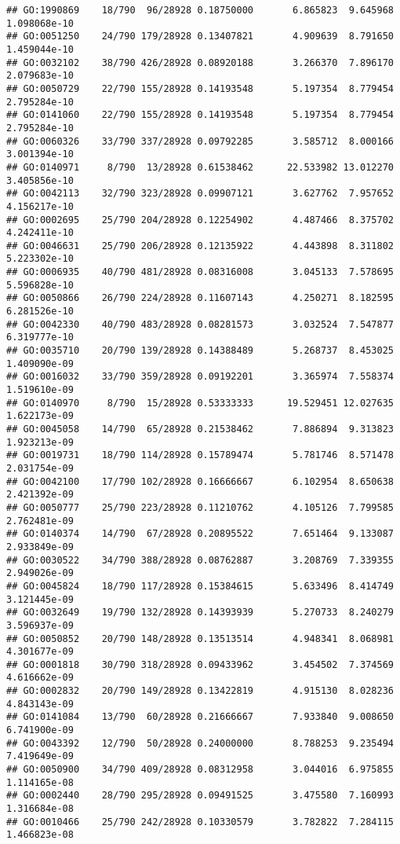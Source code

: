 \documentclass[
]{article}
\begin{document}
\begin{verbatim}
## GO:1990869    18/790  96/28928 0.18750000       6.865823  9.645968 1.098068e-10
## GO:0051250    24/790 179/28928 0.13407821       4.909639  8.791650 1.459044e-10
## GO:0032102    38/790 426/28928 0.08920188       3.266370  7.896170 2.079683e-10
## GO:0050729    22/790 155/28928 0.14193548       5.197354  8.779454 2.795284e-10
## GO:0141060    22/790 155/28928 0.14193548       5.197354  8.779454 2.795284e-10
## GO:0060326    33/790 337/28928 0.09792285       3.585712  8.000166 3.001394e-10
## GO:0140971     8/790  13/28928 0.61538462      22.533982 13.012270 3.405856e-10
## GO:0042113    32/790 323/28928 0.09907121       3.627762  7.957652 4.156217e-10
## GO:0002695    25/790 204/28928 0.12254902       4.487466  8.375702 4.242411e-10
## GO:0046631    25/790 206/28928 0.12135922       4.443898  8.311802 5.223302e-10
## GO:0006935    40/790 481/28928 0.08316008       3.045133  7.578695 5.596828e-10
## GO:0050866    26/790 224/28928 0.11607143       4.250271  8.182595 6.281526e-10
## GO:0042330    40/790 483/28928 0.08281573       3.032524  7.547877 6.319777e-10
## GO:0035710    20/790 139/28928 0.14388489       5.268737  8.453025 1.409090e-09
## GO:0016032    33/790 359/28928 0.09192201       3.365974  7.558374 1.519610e-09
## GO:0140970     8/790  15/28928 0.53333333      19.529451 12.027635 1.622173e-09
## GO:0045058    14/790  65/28928 0.21538462       7.886894  9.313823 1.923213e-09
## GO:0019731    18/790 114/28928 0.15789474       5.781746  8.571478 2.031754e-09
## GO:0042100    17/790 102/28928 0.16666667       6.102954  8.650638 2.421392e-09
## GO:0050777    25/790 223/28928 0.11210762       4.105126  7.799585 2.762481e-09
## GO:0140374    14/790  67/28928 0.20895522       7.651464  9.133087 2.933849e-09
## GO:0030522    34/790 388/28928 0.08762887       3.208769  7.339355 2.949026e-09
## GO:0045824    18/790 117/28928 0.15384615       5.633496  8.414749 3.121445e-09
## GO:0032649    19/790 132/28928 0.14393939       5.270733  8.240279 3.596937e-09
## GO:0050852    20/790 148/28928 0.13513514       4.948341  8.068981 4.301677e-09
## GO:0001818    30/790 318/28928 0.09433962       3.454502  7.374569 4.616662e-09
## GO:0002832    20/790 149/28928 0.13422819       4.915130  8.028236 4.843143e-09
## GO:0141084    13/790  60/28928 0.21666667       7.933840  9.008650 6.741900e-09
## GO:0043392    12/790  50/28928 0.24000000       8.788253  9.235494 7.419649e-09
## GO:0050900    34/790 409/28928 0.08312958       3.044016  6.975855 1.114165e-08
## GO:0002440    28/790 295/28928 0.09491525       3.475580  7.160993 1.316684e-08
## GO:0010466    25/790 242/28928 0.10330579       3.782822  7.284115 1.466823e-08

\end{verbatim}
\end{document}

